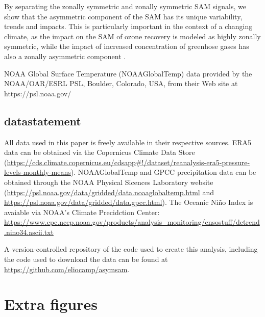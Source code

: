 \documentclass[smallextended]{svjour3}       %
\begin{document}
By separating the zonally symmetric and zonally symmetric SAM signals, we show that the asymmetric component of the SAM has its unique variability, trends and impacts. This is particularly important in the context of a changing climate, as the impact on the SAM of ozone recovery is modeled as highly zonally symmetric, while the impact of increased concentration of greenhose gases has also a zonally asymmetric component \citep{arblaster2006}.

\begin{acknowledgements}
NOAA Global Surface Temperature (NOAAGlobalTemp) data provided by the NOAA/OAR/ESRL PSL, Boulder, Colorado, USA, from their Web site at https://psl.noaa.gov/ 
\end{acknowledgements}

\hypertarget{datastatement}{%
\subsection{datastatement}\label{datastatement}}

All data used in this paper is freely available in their respective sources. ERA5 data can be obtained via the Copernicus Climate Data Store (\url{https://cds.climate.copernicus.eu/cdsapp\#!/dataset/reanalysis-era5-pressure-levels-monthly-means}). NOAAGlobalTemp and GPCC precipitation data can be obtained through the NOAA Physical Sicences Laboratory website (\url{https://psl.noaa.gov/data/gridded/data.noaaglobaltemp.html} and \url{https://psl.noaa.gov/data/gridded/data.gpcc.html}). The Oceanic Niño Index is avaiable via NOAA's Climate Precidction Center: \url{https://www.cpc.ncep.noaa.gov/products/analysis_monitoring/ensostuff/detrend.nino34.ascii.txt}

A version-controlled repository of the code used to create this analysis, including the code used to download the data can be found at \url{https://github.com/eliocamp/asymsam}.

\newpage

\appendix


\hypertarget{extra-figures}{%
\section{Extra figures}\label{extra-figures}}

\newpage
\end{document}
